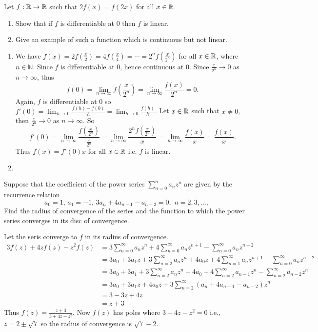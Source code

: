 \question Let $f:\mathbb{R}\to\mathbb{R}$ such that $2f(x)=f(2x)$ for all $x\in\mathbb{R}$.
\begin{enumerate}
    \item Show that if $f$ is differentiable at 0 then $f$ is linear.
    \item Give an example of such a function which is continuous but not linear.
\end{enumerate}
\begin{solution}
    \begin{enumerate}
        \item We have $f(x)=2f(\frac{x}{2})=4f(\frac{x}{4})=\cdots=2^nf\left(\frac{x}{2^n}\right)$ for all $x\in\mathbb{R}$, where $n\in\mathbb{N}$. Since $f$ is differentiable at 0, hence continuous at 0. Since $\frac{x}{2^n}\to0$ as $n\to\infty$, thus 
        $$f(0)=\lim_{n\to\infty}{f\left(\frac{x}{2^n}\right)}=\lim_{n\to\infty}{\frac{f(x)}{2^n}}=0.$$
        Again, $f$ is differentiable at 0 so $f'(0)=\lim_{h\to0}{\frac{f(h)-f(0)}{h}}=\lim_{h\to0}{\frac{f(h)}{h}}$. Let $x\in\mathbb{R}$ such that $x\neq0$, then $\frac{x}{2^n}\to0$ as $n\to\infty$. So
        $$f'(0)=\lim_{n\to\infty}{\frac{f\left(\frac{x}{2^n}\right)}{\frac{x}{2^n}}}=\lim_{n\to\infty}{\frac{2^nf\left(\frac{x}{2^n}\right)}{x}}=\lim_{n\to\infty}{\frac{f(x)}{x}}=\frac{f(x)}{x}.$$
        Thus $f(x)=f'(0)x$ for all $x\in\mathbb{R}$ i.e. $f$ is linear.
        \item 
    \end{enumerate}
\end{solution}

\question Suppose that the coefficient of the power series $\sum_{n=0}^{n}{a_nz^n}$ are given by the recurrence relation $$a_0=1,\,a_1=-1,\,3a_n+4a_{n-1}-a_{n-2}=0,\,\,n=2, 3, \ldots, $$
Find the radius of convergence of the series and the function to which the power series converges in its disc of convergence.

\begin{solution}
    Let the seris converge to $f$ in its radius of convergence.
    \begin{align*}
        3f(z)+4zf(z)-z^2f(z)&=3\sum_{n=0}^{\infty}{a_nz^{n}}+4\sum_{n=0}^{\infty}{a_nz^{n+1}}-\sum_{n=0}^{\infty}{a_nz^{n+2}}\\
        &=3a_0+3a_1z+3\sum_{n=2}^{\infty}{a_nz^{n}}+4a_0z+4\sum_{n=1}^{\infty}{a_nz^{n+1}}-\sum_{n=0}^{\infty}{a_nz^{n+2}}\\
        &=3a_0+3a_1+3\sum_{n=2}^{\infty}{a_nz^{n}}+4a_0+4\sum_{n=2}^{\infty}{a_{n-1}z^n}-\sum_{n=2}^{\infty}{a_{n-2}z^n}\\
        &=3a_0+3a_1z+4a_0z+3\sum_{n=2}^{\infty}{(a_n+4a_{n-1}-a_{n-2})z^{n}}\\
        &=3-3z+4z\\
        &=z+3
    \end{align*}
    Thus $f(z)=\frac{z+3}{3+4z-z^2}$. Now $f(z)$ has poles where $3+4z-z^2=0$ i.e., $z=2\pm\sqrt{7}$ so the radius of convergence is $\sqrt{7}-2$.
\end{solution}

